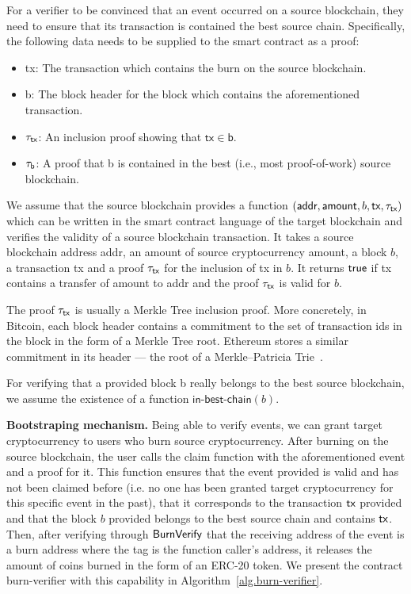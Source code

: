 For a verifier to be convinced that an event occurred on a source blockchain, they need to ensure that its transaction is contained the best source chain. Specifically, the following data needs to be supplied to the smart contract as a proof:

\begin{itemize}
  \item \textsf{tx}: The transaction which contains the burn on the source blockchain.
  \item \textsf{b}: The block header for the block which contains the aforementioned transaction.
  \item $\tau_\textsf{tx}$: An inclusion proof showing that $\mathsf{tx} \in \mathsf{b}$.
  \item $\tau_\textsf{b}$: A proof that \textsf{b} is contained in the best (i.e., most proof-of-work) source blockchain.
\end{itemize}

We assume that the source blockchain provides a function \verifytx$(\textsf{addr}, \textsf{amount}, b, \textsf{tx}, \tau_\textsf{tx})$ which can be written in the smart contract language of the target blockchain and verifies the validity of a source blockchain transaction. It takes a source blockchain address \textsf{addr}, an amount of source cryptocurrency \textsf{amount}, a block $b$, a transaction \textsf{tx} and a proof $\tau_\textsf{tx}$ for the inclusion of \textsf{tx} in $b$. It returns $\mathsf{true}$ if \textsf{tx} contains a transfer of \textsf{amount} to \textsf{addr} and the proof $\tau_\textsf{tx}$ is valid for $b$.

The proof $\tau_\textsf{tx}$ is usually a Merkle Tree inclusion proof. More concretely, in Bitcoin, each block header contains a commitment to the set of transaction ids in the block in the form of a Merkle Tree root. Ethereum stores a similar commitment in its header --- the root of a Merkle--Patricia Trie~\cite{wood2014ethereum}.

For verifying that a provided block \textsf{b} really belongs to the best source blockchain, we assume the existence of a function $\textsf{in-best-chain}(b)$.

\noindent
\textbf{Bootstraping mechanism.}
Being able to verify events, we can grant target cryptocurrency to users who burn source cryptocurrency. After burning on the source blockchain, the user calls the \textsf{claim} function with the aforementioned event and a proof for it. This function ensures that the event provided is valid and has not been claimed before (i.e. no one has been granted target cryptocurrency for this specific event in the past), that it corresponds to the transaction $\textsf{tx}$ provided and that the block $b$ provided belongs to the best source chain and contains $\textsf{tx}$. Then, after verifying through $\mathsf{BurnVerify}$ that the receiving address of the event is a burn address where the tag is the function caller's address, it releases the amount of coins burned in the form of an ERC-20 token. We present the contract \textsf{burn-verifier} with this capability in Algorithm~\ref{alg.burn-verifier}.

